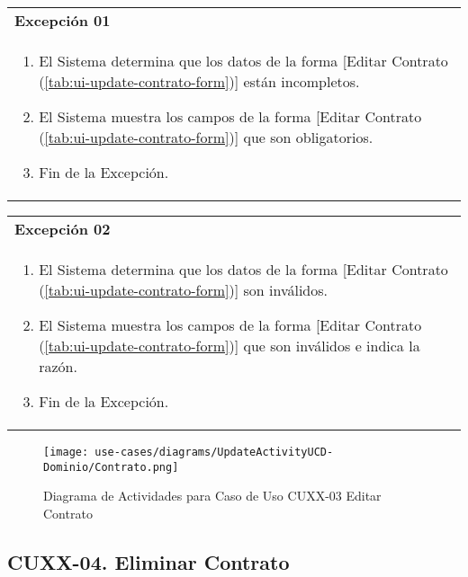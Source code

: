 	\begin{tabular}{ p{15.5cm} }
		\textbf{Excepci\'on 01} \\
		\begin{enumerate}
			\item El Sistema determina que los datos de la forma [Editar Contrato (\ref{tab:ui-update-contrato-form})] est\'an incompletos.
			\item El Sistema muestra los campos de la forma [Editar Contrato (\ref{tab:ui-update-contrato-form})] que son obligatorios.
			\item Fin de la Excepci\'on.
		\end{enumerate}
	\end{tabular}
	
	\begin{tabular}{ p{15.5cm} }
		\textbf{Excepci\'on 02} \\
		\begin{enumerate}
			\item El Sistema determina que los datos de la forma [Editar Contrato (\ref{tab:ui-update-contrato-form})] son inv\'alidos.
			\item El Sistema muestra los campos de la forma [Editar Contrato (\ref{tab:ui-update-contrato-form})] que son inv\'alidos e indica la raz\'on.
			\item Fin de la Excepci\'on.
		\end{enumerate}
	\end{tabular}
	
	\begin{figure}[H]
		\begin{center}
		 \label{tab:activity-update-ucd-entity-contrato}
		 \texttt{[image: use-cases/diagrams/UpdateActivityUCD-Dominio/Contrato.png]}
		 \caption{Diagrama de Actividades para Caso de Uso CUXX-03 Editar Contrato}
		\end{center}
	\end{figure}
	
	\clearpage
	\subsection{CUXX-04. Eliminar Contrato} \label{sec:cu-delete-Contrato}
	
